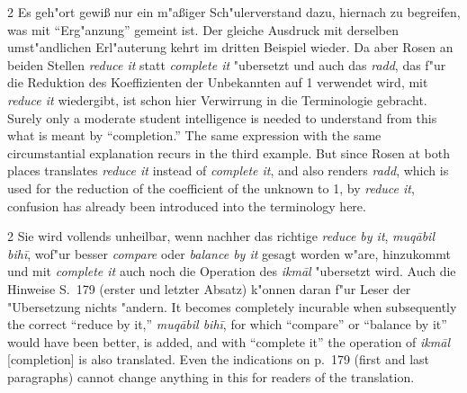 \documentclass[10pt,a4paper]{article}
\renewcommand{\switchcolumn}{\syncronize\nointerlineskip\columnbreak}
\newcommand{\enquote}[1]{``#1''}
\begin{document}
\begin{paracol}{2}
Es geh"ort gewi\ss{} nur ein m"a\ss{}iger Sch"ulerverstand dazu, hiernach zu begreifen, was mit \enquote{Erg"anzung} gemeint ist. Der gleiche Ausdruck mit derselben umst"andlichen Erl"auterung kehrt im dritten Beispiel wieder. Da aber Rosen an beiden Stellen \textit{reduce it} statt \textit{complete it} "ubersetzt und auch das \textit{radd}, das f"ur die Reduktion des Koeffizienten der Unbekannten auf 1 verwendet wird, mit \textit{reduce it} wiedergibt, ist schon hier Verwirrung in die Terminologie gebracht.
\switchcolumn
Surely only a moderate student intelligence is needed to understand from this what is meant by ``completion.'' The same expression with the same circumstantial explanation recurs in the third example. But since Rosen at both places translates \textit{reduce it} instead of \textit{complete it}, and also renders \textit{radd}, which is used for the reduction of the coefficient of the unknown to 1, by \textit{reduce it}, confusion has already been introduced into the terminology here.
\end{paracol}

\begin{paracol}{2}
Sie wird vollends unheilbar, wenn nachher das richtige \textit{reduce by it}, \textit{muq\=abil bih\={i}}, wof"ur besser \textit{compare} oder \textit{balance by it} gesagt worden w"are, hinzukommt und mit \textit{complete it} auch noch die Operation des \textit{ikm\=al} "ubersetzt wird. Auch die Hinweise S.\ 179 (erster und letzter Absatz) k"onnen daran f"ur Leser der "Ubersetzung nichts "andern.
\switchcolumn
It becomes completely incurable when subsequently the correct ``reduce by it,'' \textit{muq\=abil bih\={i}}, for which ``compare'' or ``balance by it'' would have been better, is added, and with ``complete it'' the operation of \textit{ikm\=al} [completion] is also translated. Even the indications on p.\ 179 (first and last paragraphs) cannot change anything in this for readers of the translation.
\end{paracol}
\end{document}

